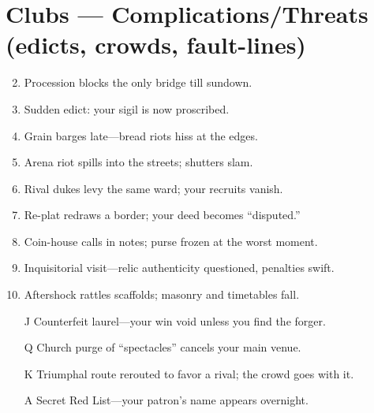 \section*{Clubs --- Complications/Threats (edicts, crowds, fault-lines)}
\label{sec:ecktoria-complications}
\begin{enumerate}
\setcounter{enumi}{1}
\item Procession blocks the only bridge till sundown.
\item Sudden edict: your sigil is now proscribed.
\item Grain barges late---bread riots hiss at the edges.
\item Arena riot spills into the streets; shutters slam.
\item Rival dukes levy the same ward; your recruits vanish.
\item Re-plat redraws a border; your deed becomes ``disputed.''
\item Coin-house calls in notes; purse frozen at the worst moment.
\item Inquisitorial visit---relic authenticity questioned, penalties swift.
\item Aftershock rattles scaffolds; masonry and timetables fall.
\item[J] Counterfeit laurel---your win void unless you find the forger.
\item[Q] Church purge of ``spectacles'' cancels your main venue.
\item[K] Triumphal route rerouted to favor a rival; the crowd goes with it.
\item[A] Secret Red List---your patron's name appears overnight.
\end{enumerate}

